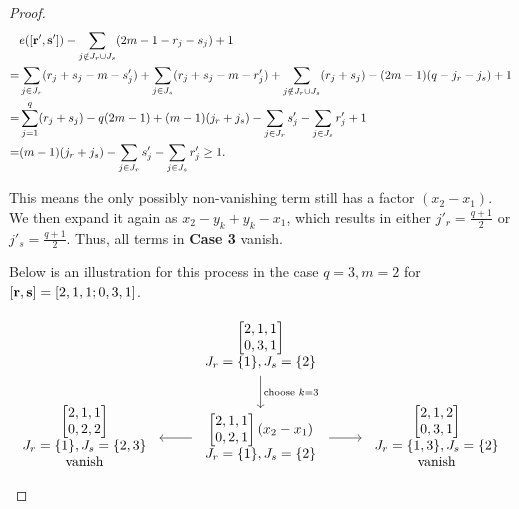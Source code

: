 \documentclass[11pt]{article}
\begin{document}
\begin{proof}
    \begin{align*}
        &e([\mathbf{r'}, \mathbf{s'}]) - \sum_{j\notin J_r\cup J_s}(2m-1-r_j-s_j) + 1\\ 
        =&\sum_{j\in J_r}(r_j + s_j - m - s'_j) + \sum_{j\in J_s}(r_j + s_j - m - r'_j) + \sum_{j\notin J_r\cup J_s} (r_j + s_j) - (2m-1)(q-j_r - j_s)+1\\ 
        =&\sum_{j = 1}^{q}(r_j + s_j) - q(2m-1)+(m-1)(j_r + j_s) - \sum_{j\in J_r}s'_j - \sum_{j\in J_s}r'_j+1\\ 
        =& (m-1)(j_r + j_s) - \sum_{j\in J_r}s'_j - \sum_{j\in J_s}r'_j \geq 1.
    \end{align*}

    This means the only possibly non-vanishing term still has a factor \((x_2 - x_1)\). We then expand it again as \(x_2 - y_k + y_k - x_1\), which results in either \(j'_r=\frac{q+1}{2}\) or \(j'_s = \frac{q+1}{2}\). Thus, all terms in \textbf{Case 3} vanish. 
    
    Below is an illustration for this process in the case \(q = 3, m = 2\) for \([\mathbf{r}, \mathbf{s}] = [2,1,1;0,3,1]\). 

    \[\begin{tikzcd}
        & \begin{array}{c} \begin{bmatrix}2,1,1\\ 0,3,1\end{bmatrix}\\ J_r = \{1\}, J_s = \{2\} \end{array} & \\
        \begin{array}{c} \begin{bmatrix}2,1,1\\ 0,2,2\end{bmatrix}\\ J_r = \{1\}, J_s = \{2,3\}\\ \text{vanish} \end{array} & \begin{array}{c} \begin{bmatrix}2,1,1\\ 0,2,1\end{bmatrix}(x_2 - x_1)\\ J_r = \{1\}, J_s = \{2\} \end{array} & \begin{array}{c} \begin{bmatrix}2,1,2\\ 0,3,1\end{bmatrix}\\ J_r = \{1,3\}, J_s = \{2\}\\ \text{vanish} \end{array}
        \arrow["\text{choose }k=3",from=1-2, to=2-2]
        \arrow[from=2-2, to=2-1]
        \arrow[from=2-2, to=2-3]
    \end{tikzcd}\]


\end{proof}
\end{document}
